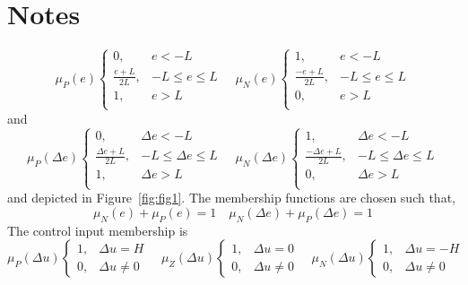 \section{Notes}
\begin{equation}
    \mu_P(e)\begin{cases}
        0,& e<-L\\
        \frac{e+L}{2L},& -L\leq e\leq L\\
        1,& e>L\\
    \end{cases}\quad
    \mu_N(e)\begin{cases}
        1,& e<-L\\
        \frac{-e+L}{2L},& -L\leq e\leq L\\
        0,& e>L\\
    \end{cases}
\end{equation}
and 
\begin{equation}
    \mu_P(\Delta e)\begin{cases}
        0,& \Delta e<-L\\
        \frac{\Delta e+L}{2L},& -L\leq \Delta e\leq L\\
        1,& \Delta e>L\\
    \end{cases}\quad
    \mu_N(\Delta e)\begin{cases}
        1,& \Delta e<-L\\
        \frac{-\Delta e+L}{2L},& -L\leq \Delta e\leq L\\
        0,& \Delta e>L\\
    \end{cases}
\end{equation}
and depicted in Figure~\ref{fig:fig1}. The membership functions are chosen such that, 
\begin{equation}
    \mu_N(e)+\mu_P(e)=1\quad \mu_N(\Delta e)+\mu_P(\Delta e)=1
\end{equation}
The control input membership is 
\begin{equation}
    \mu_P(\Delta u)\begin{cases}
        1,& \Delta u=H\\
        0,& \Delta u\neq 0
    \end{cases}\quad
    \mu_Z(\Delta u)\begin{cases}
        1,& \Delta u=0\\
        0,& \Delta u\neq 0
    \end{cases}\quad
    \mu_N(\Delta u)\begin{cases}
        1,& \Delta u=-H\\
        0,& \Delta u\neq 0
    \end{cases}
\end{equation}

